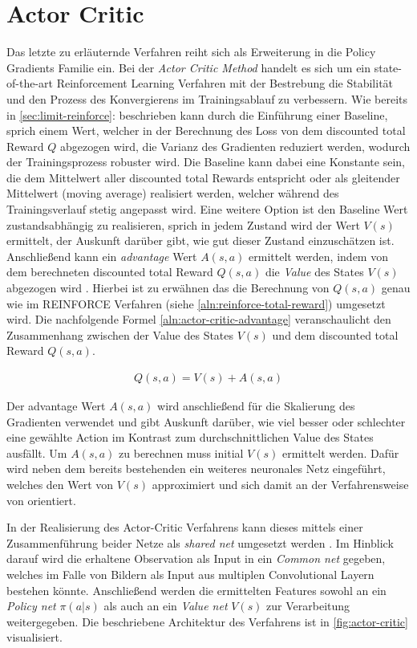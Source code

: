 \documentclass[11pt]{scrartcl}
\begin{document}
\section{Actor Critic}
Das letzte zu erläuternde Verfahren reiht sich als Erweiterung in die Policy Gradients Familie ein.
Bei der \textit{Actor Critic Method} handelt es sich um ein state-of-the-art Reinforcement Learning
Verfahren mit der Bestrebung die Stabilität und den Prozess des Konvergierens im Trainingsablauf
zu verbessern. Wie bereits in \autoref{sec:limit-reinforce}:  beschrieben
kann durch die Einführung einer Baseline, sprich einem Wert, welcher in der Berechnung des Loss von dem discounted total Reward $Q$ abgezogen wird, die Varianz des Gradienten reduziert werden, wodurch der Trainingsprozess robuster wird. Die Baseline kann dabei eine Konstante sein, die dem Mittelwert aller
discounted total Rewards entspricht oder als gleitender Mittelwert (moving average) realisiert werden,
welcher während des Trainingsverlauf stetig angepasst wird. Eine weitere Option ist den Baseline Wert
zustandsabhängig zu realisieren, sprich in jedem Zustand wird der Wert $V(s)$ ermittelt, der Auskunft
darüber gibt, wie gut dieser Zustand einzuschätzen ist. Anschließend kann ein \textit{advantage} Wert
$A(s,a)$ ermittelt werden, indem von dem berechneten discounted total Reward $Q(s,a)$ die \textit{Value}
des States $V(s)$ abgezogen wird \cite[~S.268 ff.]{L2018}. Hierbei ist zu erwähnen das die Berechnung von
$Q(s,a)$ genau wie im REINFORCE Verfahren (siehe \autoref{aln:reinforce-total-reward}) umgesetzt wird.
Die nachfolgende Formel \ref{aln:actor-critic-advantage} veranschaulicht den Zusammenhang zwischen der
Value des States $V(s)$ und dem discounted total Reward $Q(s,a)$.

\begin{align}
Q(s,a)=V(s)+A(s,a)
\label{aln:actor-critic-advantage}
\end{align}

Der advantage Wert $A(s,a)$ wird anschließend für die Skalierung des Gradienten verwendet und gibt Auskunft
darüber, wie viel besser oder schlechter eine gewählte Action im Kontrast zum durchschnittlichen Value des
States ausfällt. Um $A(s,a)$ zu berechnen muss initial $V(s)$ ermittelt werden. Dafür wird neben dem bereits
bestehenden ein weiteres neuronales Netz eingeführt, welches den Wert von $V(s)$ approximiert und sich damit
an der Verfahrensweise von  orientiert.

In der Realisierung des Actor-Critic Verfahrens kann dieses mittels einer Zusammenführung beider Netze als
\textit{shared net} umgesetzt werden  \cite[~S.269]{L2018}. Im Hinblick darauf wird die erhaltene
Observation als Input in ein \textit{Common net} gegeben, welches im Falle von Bildern als Input aus
multiplen Convolutional Layern bestehen könnte. Anschließend werden die ermittelten Features sowohl an
ein \textit{Policy net} $\pi(a|s)$ als auch an ein \textit{Value net} $V(s)$ zur Verarbeitung
weitergegeben. Die beschriebene Architektur des Verfahrens ist in \autoref{fig:actor-critic}
visualisiert.
\end{document}
